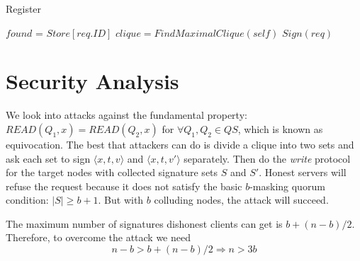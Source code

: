 \documentclass[twoside,twocolumn,10pt,fleqn]{article}
\begin{document}
\begin{algorithm}
  \caption{Register}
  \SetAlgoNoLine
  $found$ = $Store[req.ID]$\;
  {
    $clique = FindMaximalClique(self)$\;
    {
      $Sign(req)$\;
    }
  }
\end{algorithm}

\section{Security Analysis}
We look into attacks against the fundamental property:
$READ(Q_1,x) = READ(Q_2,x)$ for $\forall Q_1, Q_2 \in QS$, which is
known as equivocation.  The best that attackers can do is divide a
clique into two sets and ask each set to sign $\langle x,t,v \rangle$
and $\langle x,t,v' \rangle$ separately. Then do the {\em write}
protocol for the target nodes with collected signature sets $S$ and
$S'$. Honest servers will refuse the request because it does not
satisfy the basic $b$-masking quorum condition: $|S| \geq b+1$. But
with $b$ colluding nodes, the attack will succeed.

\newcommand{\slice}[4]{
  \pgfmathparse{0.5*#1+0.5*#2}
  \let\midangle\pgfmathresult

  \draw[thick,fill=black!10] (0,0) -- (#1:1) arc (#1:#2:1) -- cycle;

  \node[label=\midangle:#4] at (\midangle:1) {};

  \pgfmathparse{min((#2-#1-10)/110*(-0.3),0)}
  \let\temp\pgfmathresult
  \pgfmathparse{max(\temp,-0.5) + 0.8}
  \let\innerpos\pgfmathresult
  \node at (\midangle:\innerpos) {#3};
}


The maximum number of signatures dishonest clients can get is
$b+(n-b)/2$. Therefore, to overcome the attack we need
\[ n-b > b+(n-b)/2 \Rightarrow n > 3b \]
\end{document}
